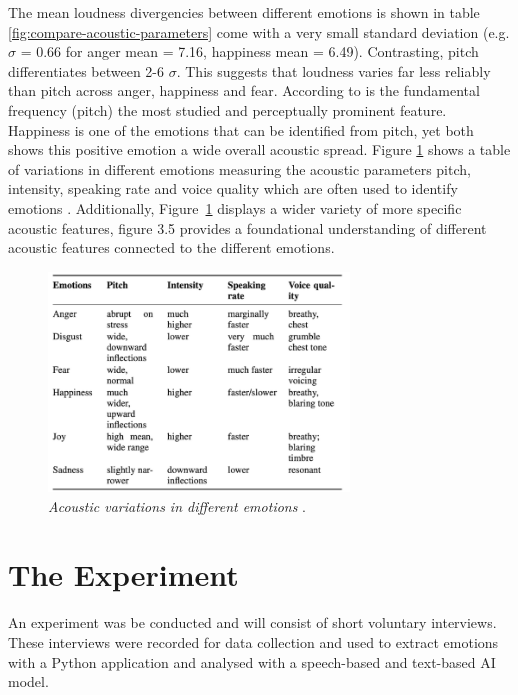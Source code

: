 The mean loudness divergencies between different emotions is shown in table \ref{fig:compare-acoustic-parameters} come with a very small standard deviation (e.g. $\sigma$ = 0.66 for anger mean = 7.16, happiness mean = 6.49). Contrasting, pitch differentiates between 2-6 $\sigma$. 
This suggests that loudness varies far less reliably than pitch across anger, happiness and fear. According to \textcite{Banse1996} is the fundamental frequency (pitch) the most studied and perceptually prominent feature. Happiness is one of the emotions that can be identified from pitch, yet both \textcites{Banse1996}{Ekberg2023} shows this positive emotion a wide overall acoustic spread. 
Figure \ref{fig:acoustic-variations} shows a table of variations in different emotions measuring the acoustic parameters pitch, intensity, speaking rate and voice quality which are often used to identify emotions \autocite{Khalil2019}. Additionally, Figure~\ref{fig:acoustic-variations} displays a wider variety of more specific acoustic features, figure 3.5 provides a foundational understanding of different acoustic features connected to the different emotions.

\begin{figure}[H]
    \centering
    \includegraphics[width=8cm]{png/Figure8-AcousticVariations.png}
    \caption{\textit{Acoustic variations in different emotions} \autocite{Khalil2019}.}
    \label{fig:acoustic-variations}
\end{figure}

\section{The Experiment}

An experiment was be conducted and will consist of short voluntary interviews. These interviews were recorded for data collection and used to extract emotions with a Python application and analysed with a speech-based and text-based AI model.

